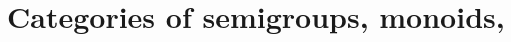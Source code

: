 
\section[Categories of structures]{Categories of semigroups, monoids, \etc}
\label{sec:cats-of-semigroups-monoids-etc}


